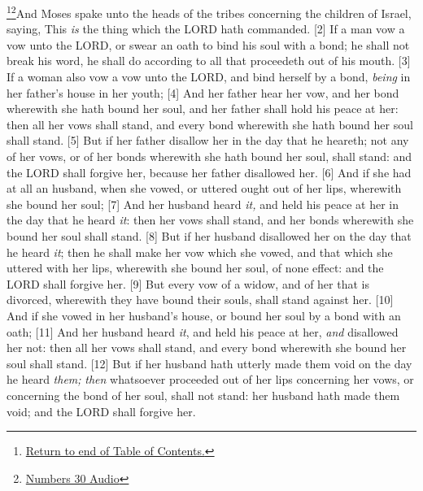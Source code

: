 \footnote{\textcolor[rgb]{0.00,0.25,0.00}{\hyperlink{NumbersTOC}{Return to end of Table of Contents.}}}\footnote{\href{https://audiobible.com/bible/numbers_30.html}{\textcolor[cmyk]{0.99998,1,0,0}{Numbers 30 Audio}}}\textcolor[cmyk]{0.99998,1,0,0}{And Moses spake unto the heads of the tribes concerning the children of Israel, saying, This \emph{is} the thing which the LORD hath commanded.}
[2] \textcolor[cmyk]{0.99998,1,0,0}{If a man vow a vow unto the LORD, or swear an oath to bind his soul with a bond; he shall not break his word, he shall do according to all that proceedeth out of his mouth.}
[3] \textcolor[cmyk]{0.99998,1,0,0}{If a woman also vow a vow unto the LORD, and bind herself by a bond, \emph{being} in her father's house in her youth;}
[4] \textcolor[cmyk]{0.99998,1,0,0}{And her father hear her vow, and her bond wherewith she hath bound her soul, and her father shall hold his peace at her: then all her vows shall stand, and every bond wherewith she hath bound her soul shall stand.}
[5] \textcolor[cmyk]{0.99998,1,0,0}{But if her father disallow her in the day that he heareth; not any of her vows, or of her bonds wherewith she hath bound her soul, shall stand: and the LORD shall forgive her, because her father disallowed her.}
[6] \textcolor[cmyk]{0.99998,1,0,0}{And if she had at all an husband, when she vowed, or uttered ought out of her lips, wherewith she bound her soul;}
[7] \textcolor[cmyk]{0.99998,1,0,0}{And her husband heard \emph{it,} and held his peace at her in the day that he heard \emph{it}: then her vows shall stand, and her bonds wherewith she bound her soul shall stand.}
[8] \textcolor[cmyk]{0.99998,1,0,0}{But if her husband disallowed her on the day that he heard \emph{it}; then he shall make her vow which she vowed, and that which she uttered with her lips, wherewith she bound her soul, of none effect: and the LORD shall forgive her.}
[9] \textcolor[cmyk]{0.99998,1,0,0}{But every vow of a widow, and of her that is divorced, wherewith they have bound their souls, shall stand against her.}
[10] \textcolor[cmyk]{0.99998,1,0,0}{And if she vowed in her husband's house, or bound her soul by a bond with an oath;}
[11] \textcolor[cmyk]{0.99998,1,0,0}{And her husband heard \emph{it}, and held his peace at her, \emph{and} disallowed her not: then all her vows shall stand, and every bond wherewith she bound her soul shall stand.}
[12] \textcolor[cmyk]{0.99998,1,0,0}{But if her husband hath utterly made them void on the day he heard \emph{them;} \emph{then} whatsoever proceeded out of her lips concerning her vows, or concerning the bond of her soul, shall not stand: her husband hath made them void; and the LORD shall forgive her.}
